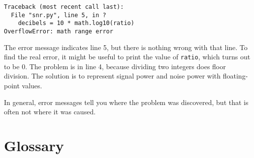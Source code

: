 
\beforeverb
\begin{verbatim}
Traceback (most recent call last):
  File "snr.py", line 5, in ?
    decibels = 10 * math.log10(ratio)
OverflowError: math range error
\end{verbatim}
\afterverb
%
The error message indicates line 5, but there is nothing
wrong with that line.  To find the real error, it might be
useful to print the value of {\tt ratio}, which turns out to
be 0.  The problem is in line 4, because dividing two integers
does floor division.  The solution is to represent signal power
and noise power with floating-point values.


In general, error messages tell you where the problem was discovered, 
but that is often not where it was caused.


\section{Glossary}

